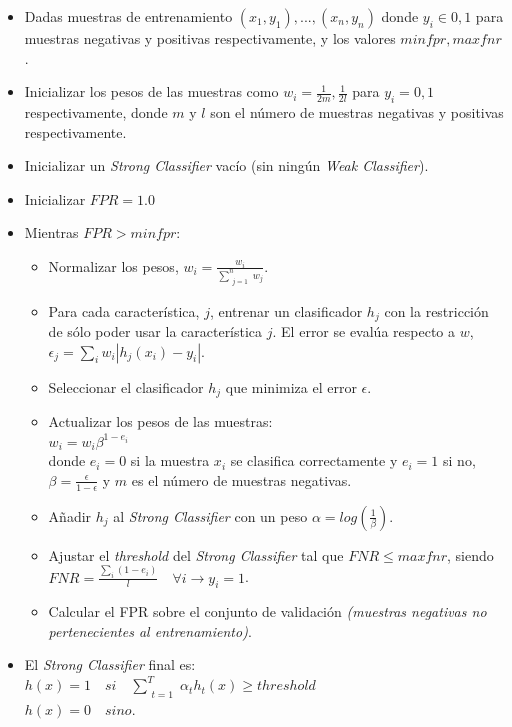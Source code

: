 \documentclass[11pt,spanish,a4paper]{article} %
\begin{document}
\begin{footnotesize}
\begin{itemize}
\item Dadas muestras de entrenamiento $(x_1,y_1), ..., (x_n, y_n)$ donde $y_i \in {0,1}$ para muestras negativas y positivas respectivamente, y los valores $minfpr, maxfnr$.
\item Inicializar los pesos de las muestras como $w_i = \frac{1}{2m}, \frac{1}{2l}$ para $y_i = 0, 1$ respectivamente, donde $m$ y $l$ son el número de muestras negativas y positivas respectivamente.
\item Inicializar un \textit{Strong Classifier} vacío (sin ningún \textit{Weak Classifier}).
\item Inicializar $FPR = 1.0$
\item Mientras $FPR > minfpr$:
  \begin{itemize}
  \item Normalizar los pesos, $w_i = \frac{w_i}{\sum_{\substack{j=1}}^{n}w_j}$.
  \item Para cada característica, $j$, entrenar un clasificador $h_j$ con la restricción de sólo poder usar la característica $j$. El error se evalúa respecto a $w$,\\$\epsilon_j = \sum_i w_i |h_j(x_i)-y_i|$.
  \item Seleccionar el clasificador $h_j$ que minimiza el error $\epsilon$.
  \item Actualizar los pesos de las muestras:\\\hspace*{3em}$w_i = w_i\beta^{1-e_i}$\\donde $e_i = 0$ si la muestra $x_i$ se clasifica correctamente y $e_i = 1$ si no, $\beta = \frac{\epsilon}{1-\epsilon}$ y $m$ es el número de muestras negativas.
  \item Añadir $h_j$ al \textit{Strong Classifier} con un peso $\alpha = log(\frac{1}{\beta})$.
  \item Ajustar el \textit{threshold} del \textit{Strong Classifier} tal que $FNR \leq maxfnr$, siendo\\\hspace*{3em}$FNR = \frac{\sum_i (1-e_i)}{l} \quad \forall i \rightarrow y_i = 1$.
  \item Calcular el FPR sobre el conjunto de validación \textit{(muestras negativas no pertenecientes al entrenamiento)}.
  \end{itemize}
\item El \textit{Strong Classifier} final es:\\\hspace*{3em}$h(x) = 1 \quad si \quad \sum_{\substack{t=1}}^T \alpha_t h_t(x) \geq threshold$\\\hspace*{3em}$h(x) = 0 \quad sino$.
\end{itemize}
\end{footnotesize}
\end{document}
